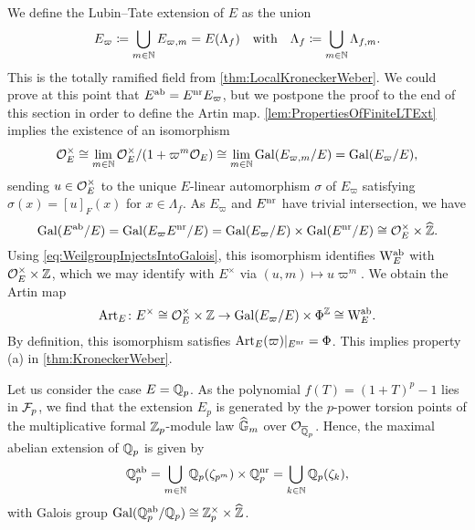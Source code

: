 \documentclass[../main.tex]{subfiles}
\begin{document}
We define the Lubin--Tate extension of $E$ as the union
\begin{equation*}
  E_\varpi \coloneq \bigcup_{m \in \mathbb{N}} E_{\varpi, m} = E(\Lambda_f) \quad
  \text{with} \quad \Lambda_f \coloneqq \bigcup_{m \in \mathbb{N}} \Lambda_{f,m}.
\end{equation*}
This is the totally ramified field from \cref{thm:LocalKroneckerWeber}.
We could prove at this point that $E^{\mathrm{ab}} = E^{\mathrm{nr}} E_\varpi$, but we postpone the
proof to the end of this section in order to define the Artin map. 
\cref{lem:PropertiesOfFiniteLTExt} implies the existence of an isomorphism
\begin{equation*}
  \mathcal{O}_E^\times \cong \lim_{m \in \mathbb{N}} \mathcal{O}_E^\times/(1 + \varpi^m \mathcal{O}_E) \cong
  \lim_{m \in \mathbb{N}} \operatorname{Gal}(E_{\varpi,m}/E) = \operatorname{Gal}(E_\varpi/E),
\end{equation*}
sending $u \in \mathcal{O}_E^\times$ to the unique $E$-linear automorphism $\sigma$ of
$E_\varpi$ satisfying $\sigma(x) = [u]_F(x)$ for $x \in \Lambda_f$. 
As $E_\varpi$ and $E^{\mathrm{nr}}$ have trivial intersection, we have
\begin{equation*}
  \operatorname{Gal}(E^{\mathrm{ab}} /E) = \operatorname{Gal}(E_\varpi E^{\mathrm{nr}} / E) = \operatorname{Gal}(E_\varpi/E) \times
  \operatorname{Gal}(E^{\mathrm{nr}} /E) \cong \mathcal{O}_E^\times \times \widehat {\mathbb{Z}}.
\end{equation*}
Using \eqref{eq:WeilgroupInjectsIntoGalois}, this isomorphism
identifies $\mathrm W_E^{\mathrm{ab}}$ with $\mathcal{O}_E^\times \times \mathbb{Z}$, which we may identify 
with $E^\times$ via $(u, m) \mapsto u \varpi^m$. We obtain the Artin map
\begin{equation*}
  \operatorname{Art}_E\colon E^\times \cong \mathcal{O}_E^\times \times \mathbb{Z} \to 
  \operatorname{Gal}(E_\varpi/E) \times \Phi^{\mathbb{Z}} \cong \mathrm W_E^{\mathrm{ab}}.
\end{equation*}
By definition, this isomorphism satisfies 
$\operatorname{Art}_E(\varpi)|_{E^{\mathrm{nr}}} = \Phi$. This implies property (a) in 
\cref{thm:KroneckerWeber}. 

\begin{xpl}
  Let us consider the case $E = \mathbb{Q}_p$. As the polynomial 
  $f(T) = (1+T)^p - 1$ lies in $\mathcal{F}_p$, we find that the extension $E_p$ is generated
  by the $p$-power torsion points of the multiplicative formal $\mathbb{Z}_p$-module law
  $\widehat{\mathbb{G}}_m$ over $\mathcal{O}_{\overline {\mathbb{Q}}_p}$.
  Hence, the maximal abelian extension of $\mathbb{Q}_p$ is given by 
  \begin{equation*}
    \mathbb{Q}_p^{\mathrm{ab}} = \bigcup_{m \in \mathbb{N}} \mathbb{Q}_p(\zeta_{p^m}) \times \mathbb{Q}_p^{\mathrm{nr}}
             = \bigcup_{k \in \mathbb{N}} \mathbb{Q}_p(\zeta_k),
  \end{equation*}
  with Galois group $\operatorname{Gal}(\mathbb{Q}_p^{\mathrm{ab}} /\mathbb{Q}_p) \cong \mathbb{Z}_p^\times \times \widehat {\mathbb{Z}}$. 
\end{xpl}
\end{document}
